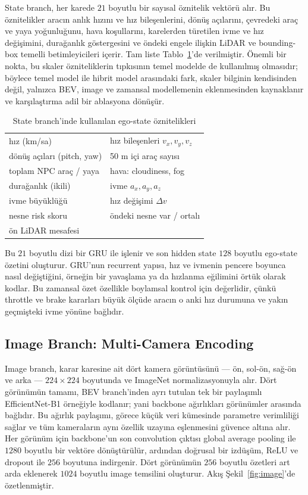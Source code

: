 \documentclass[conference]{IEEEtran}
\begin{document}
State branch, her karede $21$ boyutlu bir sayısal öznitelik vektörü alır. Bu öznitelikler aracın anlık hızını ve hız bileşenlerini, dönüş açılarını, çevredeki araç ve yaya yoğunluğunu, hava koşullarını, karelerden türetilen ivme ve hız değişimini, durağanlık göstergesini ve öndeki engele ilişkin LiDAR ve bounding-box temelli betimleyicileri içerir. Tam liste Tablo~\ref{tab:ego}'de verilmiştir. Önemli bir nokta, bu skaler özniteliklerin tıpkısının temel modelde de kullanılmış olmasıdır; böylece temel model ile hibrit model arasındaki fark, skaler bilginin kendisinden değil, yalnızca BEV, image ve zamansal modellemenin eklenmesinden kaynaklanır ve karşılaştırma adil bir ablasyona dönüşür.

\begin{table}[t]
\caption{State branch'inde kullanılan ego-state öznitelikleri}
\label{tab:ego}
\centering
\footnotesize
\begin{tabular}{@{}p{}p{}@{}}
\toprule
hız (km/sa) & hız bileşenleri $v_x, v_y, v_z$ \\
dönüş açıları (pitch, yaw) & 50 m içi araç sayısı \\
toplam NPC araç / yaya & hava: cloudiness, fog \\
durağanlık (ikili) & ivme $a_x, a_y, a_z$ \\
ivme büyüklüğü & hız değişimi $\Delta v$ \\
nesne risk skoru & öndeki nesne var / ortalı \\
ön LiDAR mesafesi & \\
\bottomrule
\end{tabular}
\end{table}

Bu $21$ boyutlu dizi bir GRU ile işlenir ve son hidden state $128$ boyutlu ego-state özetini oluşturur. GRU'nun recurrent yapısı, hız ve ivmenin pencere boyunca nasıl değiştiğini, örneğin bir yavaşlama ya da hızlanma eğilimini örtük olarak kodlar. Bu zamansal özet özellikle boylamsal kontrol için değerlidir, çünkü throttle ve brake kararları büyük ölçüde aracın o anki hız durumuna ve yakın geçmişteki ivme yönüne bağlıdır.

\subsection{Image Branch: Multi-Camera Encoding}

Image branch, karar karesine ait dört kamera görüntüsünü --- ön, sol-ön, sağ-ön ve arka --- $224\times224$ boyutunda ve ImageNet normalizasyonuyla alır. Dört görünümün tamamı, BEV branch'inden ayrı tutulan tek bir paylaşımlı EfficientNet-B1 örneğiyle kodlanır; yani backbone ağırlıkları görünümler arasında bağlıdır. Bu ağırlık paylaşımı, görece küçük veri kümesinde parametre verimliliği sağlar ve tüm kameraların aynı özellik uzayına eşlenmesini güvence altına alır. Her görünüm için backbone'un son convolution çıktısı global average pooling ile $1280$ boyutlu bir vektöre dönüştürülür, ardından doğrusal bir izdüşüm, ReLU ve dropout ile $256$ boyutuna indirgenir. Dört görünümün $256$ boyutlu özetleri art arda eklenerek $1024$ boyutlu image temsilini oluşturur. Akış Şekil~\ref{fig:image}'de özetlenmiştir.
\end{document}
